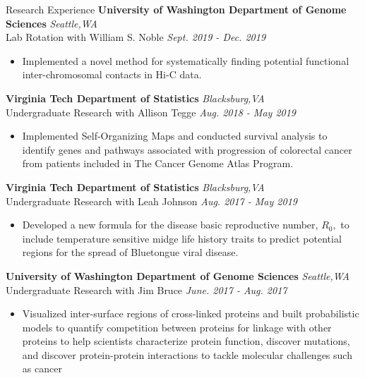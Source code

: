 \documentclass{resume} %
\begin{document}
\begin{rSection}{Research Experience}
{\bf University of Washington Department of Genome Sciences} \hfill { \em Seattle,WA}\\
{Lab Rotation with William S. Noble} \hfill {\em Sept. 2019 - Dec. 2019}
\begin{itemize}
    \item Implemented a novel method for systematically finding potential functional inter-chromosomal contacts in Hi-C data.
\end{itemize}

{\bf Virginia Tech Department of Statistics} \hfill { \em Blacksburg,VA}\\
{Undergraduate Research with Allison Tegge} \hfill {\em Aug. 2018 - May 2019}
\begin{itemize}
    \item Implemented Self-Organizing Maps and conducted survival analysis to identify genes and pathways associated with progression of colorectal cancer from patients included in The Cancer Genome Atlas Program.
\end{itemize}

{\bf Virginia Tech Department of Statistics} \hfill { \em Blacksburg,VA}\\
{Undergraduate Research with Leah Johnson} \hfill {\em Aug. 2017 - May 2019}
\begin{itemize}
    \item Developed a new formula for the disease basic reproductive number, $R_0,$ to include temperature sensitive midge life history traits to predict potential regions for the spread of Bluetongue viral disease.
\end{itemize}


{\bf University of Washington Department of Genome Sciences} \hfill { \em Seattle,WA}\\
{Undergraduate Research with Jim Bruce} \hfill {\em June. 2017 - Aug. 2017}
\begin{itemize}
    \item Visualized inter-surface regions of cross-linked proteins and built probabilistic models to quantify competition between proteins for linkage with other proteins to help scientists characterize protein function, discover mutations, and discover protein-protein interactions to tackle molecular challenges such as cancer
\end{itemize}

\end{rSection}
\end{document}
